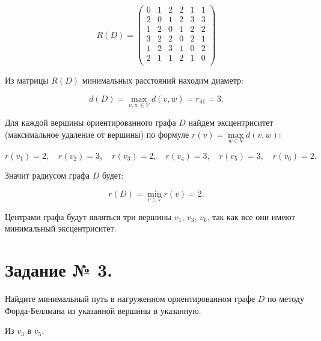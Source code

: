 \documentclass[fleqn]{article}
\begin{document}
$$R(D)=
\begin{pmatrix}
0 & 1 & 2 & 2 & 1 & 1 \\
2 & 0 & 1 & 2 & 3 & 3 \\
1 & 2 & 0 & 1 & 2 & 2 \\
3 & 2 & 2 & 0 & 2 & 1 \\
1 & 2 & 3 & 1 & 0 & 2 \\
2 & 1 & 1 & 2 & 1 & 0 \\
\end{pmatrix}
$$

Из матрицы $R(D)$ минимальных расстояний находим диаметр:

$$d(D)=\max\limits_{v,w\in V} d(v,w)=r_{41}=3.$$

Для каждой вершины ориентированного графа $D$ найдем эксцентриситет (максимальное удаление от вершины) по формуле $r(v)=\max\limits_{w\in V} d(v,w)$:

$$r(v_1)=2,\quad r(v_2)=3,\quad r(v_3)=2,\quad r(v_4)=3,\quad r(v_5)=3,\quad r(v_6)=2.$$

Значит радиусом графа $D$ будет:

$$r(D)=\min\limits_{v\in V}r(v)=2.$$

Центрами графа будут являться три вершины $v_1$, $v_3$, $v_6$, так как все они имеют минимальный эксцентриситет.

\section*{Задание № 3.}

Найдите минимальный путь в нагруженном ориентированном графе $D$ по методу Форда-Беллмана из указанной вершины в указанную.

Из $v_3$ в $v_5$.

\medskip
\end{document}

